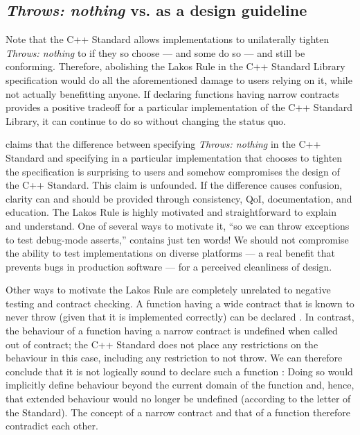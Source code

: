 \subsection{\emph{Throws: nothing} vs.  as a design guideline}

Note that the C++ Standard allows implementations to unilaterally tighten \emph{Throws: nothing} to  if they so choose --- and some do so --- and still be conforming. Therefore, abolishing the Lakos Rule in the C++ Standard Library specification would do all the aforementioned damage to users relying on it, while not actually benefitting anyone. If declaring functions having narrow contracts  provides a positive tradeoff for a particular implementation of the C++ Standard Library, it can continue to do so without changing the status quo.

\cite{P1656R2} claims that the difference between specifying \emph{Throws: nothing} in the C++ Standard and specifying  in a particular implementation that chooses to tighten the specification is surprising to users and somehow compromises the design of the C++ Standard. This claim is unfounded. If the difference causes confusion, clarity can and should be provided through consistency, QoI, documentation, and education. The Lakos Rule is highly motivated and straightforward to explain and understand. One of several ways to motivate it,  ``so we can throw exceptions to test debug-mode asserts,'' contains just ten words! We should not compromise the ability to test implementations on diverse platforms --- a real benefit that prevents bugs in production software --- for a perceived cleanliness of design.

Other ways to motivate the Lakos Rule are completely unrelated to negative testing and contract checking. A function having a wide contract that is known to never throw (given that it is implemented correctly) can be declared . In contrast, the behaviour of a function having a narrow contract is undefined when called out of contract; the C++ Standard does not place any restrictions on the behaviour in this case, including any restriction to not throw. We can therefore conclude that it is not logically sound to declare such a function : Doing so would implicitly define behaviour beyond the current domain of the function and, hence, that extended behaviour would no longer be undefined (according to the letter of the Standard). The concept of a narrow contract and that of a  function therefore contradict each other.

